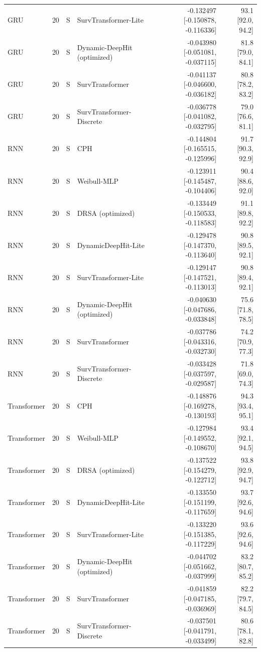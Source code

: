 \begin{longtable}{lll p{3.0cm} rr}
GRU & 20 & S & SurvTransformer-Lite & -0.132497 [-0.150878, -0.116336] & 93.1 [92.0, 94.2]\\
GRU & 20 & S & Dynamic-DeepHit (optimized) & -0.043980 [-0.051081, -0.037115] & 81.8 [79.0, 84.1]\\
GRU & 20 & S & SurvTransformer & -0.041137 [-0.046600, -0.036182] & 80.8 [78.2, 83.2]\\
GRU & 20 & S & SurvTransformer-Discrete & -0.036778 [-0.041082, -0.032795] & 79.0 [76.6, 81.1]\\
RNN & 20 & S & CPH & -0.144804 [-0.165515, -0.125996] & 91.7 [90.3, 92.9]\\
RNN & 20 & S & Weibull-MLP & -0.123911 [-0.145487, -0.104406] & 90.4 [88.6, 92.0]\\
RNN & 20 & S & DRSA (optimized) & -0.133449 [-0.150533, -0.118583] & 91.1 [89.8, 92.2]\\
RNN & 20 & S & DynamicDeepHit-Lite & -0.129478 [-0.147370, -0.113640] & 90.8 [89.5, 92.1]\\
RNN & 20 & S & SurvTransformer-Lite & -0.129147 [-0.147521, -0.113013] & 90.8 [89.4, 92.1]\\
RNN & 20 & S & Dynamic-DeepHit (optimized) & -0.040630 [-0.047686, -0.033848] & 75.6 [71.8, 78.5]\\
RNN & 20 & S & SurvTransformer & -0.037786 [-0.043316, -0.032730] & 74.2 [70.9, 77.3]\\
RNN & 20 & S & SurvTransformer-Discrete & -0.033428 [-0.037597, -0.029587] & 71.8 [69.0, 74.3]\\
Transformer & 20 & S & CPH & -0.148876 [-0.169278, -0.130193] & 94.3 [93.4, 95.1]\\
Transformer & 20 & S & Weibull-MLP & -0.127984 [-0.149552, -0.108670] & 93.4 [92.1, 94.5]\\
Transformer & 20 & S & DRSA (optimized) & -0.137522 [-0.154279, -0.122712] & 93.8 [92.9, 94.7]\\
Transformer & 20 & S & DynamicDeepHit-Lite & -0.133550 [-0.151199, -0.117659] & 93.7 [92.6, 94.6]\\
Transformer & 20 & S & SurvTransformer-Lite & -0.133220 [-0.151385, -0.117229] & 93.6 [92.6, 94.6]\\
Transformer & 20 & S & Dynamic-DeepHit (optimized) & -0.044702 [-0.051662, -0.037999] & 83.2 [80.7, 85.2]\\
Transformer & 20 & S & SurvTransformer & -0.041859 [-0.047185, -0.036969] & 82.2 [79.7, 84.5]\\
Transformer & 20 & S & SurvTransformer-Discrete & -0.037501 [-0.041791, -0.033499] & 80.6 [78.1, 82.8]\\

\end{longtable}
